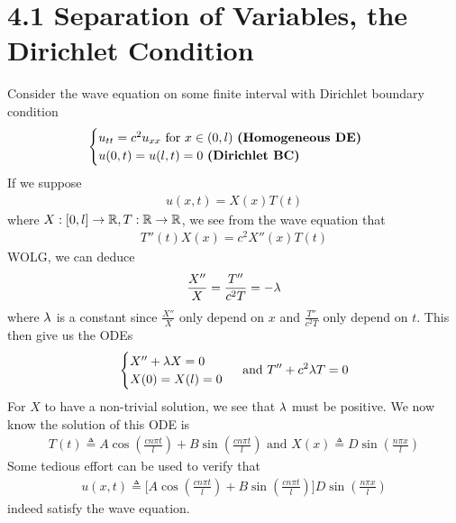 \documentclass{report}
\begin{document}
\section{4.1 Separation of Variables, the Dirichlet Condition}
\begin{mdframed}
Consider the wave equation on some finite interval with Dirichlet boundary condition 
\begin{align*}
\begin{cases}
  u_{tt}=c^2u_{xx}\text{ for }x\in (0,l)\text{ \textbf{(Homogeneous DE)} } \\
  u(0,t)=u(l,t)=0\text{ \textbf{(Dirichlet BC)} }
\end{cases}
\end{align*}
If we suppose 
\begin{align*}
u(x,t)=X(x)T(t)
\end{align*}
where $X:[0,l]\rightarrow \mathbb{R},T:\mathbb{R}\rightarrow \mathbb{R}$, we see from the wave equation that 
\begin{align*}
T''(t)X(x)=c^2X''(x)T(t)
\end{align*}
WOLG, we can deduce 
\begin{align*}
\frac{X''}{X}=\frac{T''}{c^2T}=-\lambda 
\end{align*}
where $\lambda $ is a constant since $\frac{X''}{X}$ only depend on $x$ and  $\frac{T''}{c^2T}$ only depend on $t$. This then give us the ODEs 
\begin{align*}
\begin{cases}
  X''+\lambda  X=0 \\
  X(0)=X(l)=0
\end{cases}\text{ and }T''+c^2\lambda  T=0 
\end{align*}
For $X$ to have a non-trivial solution, we see that  $\lambda $ must be positive. We now know the solution of this ODE is 
\begin{align*}
T(t)\triangleq A\cos ( \frac{ cn \pi t}{l} )+B\sin ( \frac{cn \pi t}{l})\text{ and }X(x)\triangleq D\sin ( \frac{n \pi x}{l} )
\end{align*}
Some tedious effort can be used to verify that 
\begin{align*}
u(x,t)\triangleq \Big[ A\cos (\frac{c n \pi t}{l})+ B \sin ( \frac{c n \pi t}{l}) \Big]D \sin ( \frac{n \pi x}{l})
\end{align*}
indeed satisfy the wave equation. 
\end{mdframed}
\end{document}
